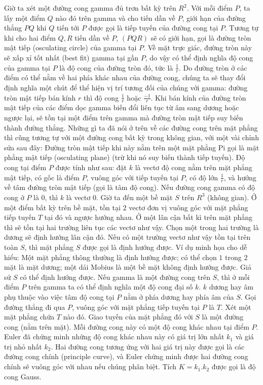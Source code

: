 \begin{multicols}{2}
	\vskip 0.1cm
	Giờ ta xét một đường cong gamma đủ trơn bất kỳ trên $R^2$. Với mỗi điểm $P$, ta lấy một điểm $Q$ nào đó trên gamma và cho tiến dần về $P$, giới hạn của đường thẳng $PQ$ khi $Q$ tiến tới $P$ được gọi là tiếp tuyến của đường cong tại $P$. Tương tự khi cho hai điểm $Q, R$ tiến dần về $P$, $(PQR)$ sẽ có giới hạn, gọi là đường tròn mật tiếp (osculating circle) của gamma tại $P$. Về mặt trực giác, đường tròn này sẽ xấp xỉ tốt nhất (best fit) gamma tại gần $P$, do vậy có thể định nghĩa độ cong của gamma tại $P$ là độ cong của đường tròn đó, tức là $ \frac{1}{r}$. Do đường tròn ở các điểm có thể nằm về hai phía khác nhau của đường cong, chúng ta sẽ thay đổi định nghĩa một chút để thể hiện vị trí tương đối của chúng với gamma: đường tròn mật tiếp bán kính $r$ thì độ cong $ \frac{1}{r}$ hoặc $ \frac{-1}{r}$. Khi bán kính của đường tròn mật tiếp của các điểm dọc gamma biến đổi liên tục từ âm sang dương hoặc ngược lại, sẽ tồn tại một điểm trên gamma mà đường tròn mật tiếp suy biến thành đường thẳng.
	\vskip 0.1cm
	Những gì ta đã nói ở trên về các đường cong trên mặt phẳng thì cũng tương tự với một đường cong bất kỳ trong không gian, với một vài chỉnh sửa sau đây:
	\vskip 0.1cm
	Đường tròn mật tiếp khi này nằm trên một mặt phẳng Pi gọi là mặt phẳng mật tiếp (osculating plane) (trừ khi nó suy biến thành tiếp tuyến). Độ cong tại điểm $P$ được tính như sau: đặt $k$ là vectơ độ cong nằm trên mặt phẳng mật tiếp, có gốc là điểm $P$, vuông góc với tiếp tuyến tại $P$, có độ lớn $ \frac{1}{r}$, và hướng về tâm đường tròn mật tiếp (gọi là tâm độ cong). Nếu đường cong gamma có độ cong ở $P$ là $0$, thì $k$ là vectơ $0$. 
	\vskip 0.1cm
	Giờ ta đến một bề mặt $S$ trên $R^3$ (không gian). Ở một điểm bất kỳ trên bề mặt, tồn tại $2$ vectơ đơn vị vuông góc với mặt phẳng tiếp tuyến $T$ tại đó và ngược hướng nhau. Ở một lân cận bất kì trên mặt phẳng thì sẽ tồn tại hai trường liên tục các vectơ như vậy. Chọn một trong hai trường là dương sẽ định hướng lân cận đó. Nếu có một trường vectơ như vậy tồn tại trên toàn $S$, thì mặt phẳng $S$ được gọi là định hướng được. 
	\vskip 0.1cm
	Ví dụ minh họa cho dễ hiểu: Một mặt phẳng thông thường là định hướng được; có thể chọn $1$ trong $2$ mặt là mặt dương; một dải Mobius là một bề mặt không định hướng được.
	\vskip 0.1cm
	Giả sử $S$ có thể định hướng được. Nếu gamma là một đường cong trên $S$, thì ở mỗi điểm $P$ trên gamma ta có thể định nghĩa một độ cong đại số $k$. $k$ dương hay âm phụ thuộc vào việc tâm độ cong tại $P$ nằm ở phía dương hay phía âm của $S$.
	\vskip 0.1cm
	Gọi đường thẳng đi qua $P$, vuông góc với mặt phẳng tiếp tuyến tại $P$ là $T$. Xét một mặt phẳng chứa $T$ nào đó. Giao tuyến của mặt phẳng đó với $S$ là một đường cong (nằm trên mặt). Mỗi đường cong này có một độ cong khác nhau tại điểm $P$. Euler đã chứng minh những độ cong khác nhau này có giá trị lớn nhất $k_1$ và giá trị nhỏ nhất $k_2$. Hai đường cong tương ứng với hai giá trị này được gọi là các đường cong chính (principle curve), và Euler chứng minh được hai đường cong chính sẽ vuông góc với nhau nếu chúng phân biệt. Tích $K = k_1.k_2$ được gọi là độ cong Gauss. 

\end{multicols}
